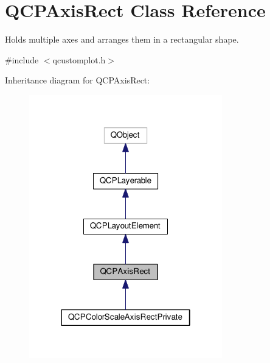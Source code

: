 \hypertarget{classQCPAxisRect}{}\section{Q\+C\+P\+Axis\+Rect Class Reference}
\label{classQCPAxisRect}


Holds multiple axes and arranges them in a rectangular shape.  




{\ttfamily \#include $<$qcustomplot.\+h$>$}



Inheritance diagram for Q\+C\+P\+Axis\+Rect\+:\nopagebreak
\begin{figure}[H]
\begin{center}
\leavevmode
\includegraphics[width=238pt]{classQCPAxisRect__inherit__graph}
\end{center}
\end{figure}


